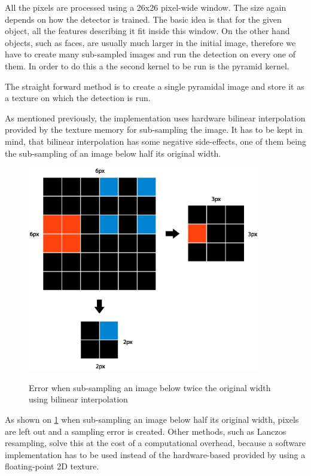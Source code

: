 All the pixels are processed using a 26x26 pixel-wide window. The size again depends on how the detector is trained. The basic idea is that for the given object, all the features describing it fit inside this window. On the other hand objects, such as faces, are usually much larger in the initial image, therefore we have to create many sub-sampled images and run the detection on every one of them. In order to do this a the second kernel to be run is the pyramid kernel.

The straight forward method is to create a single pyramidal image and store it as a texture on which the detection is run.

As mentioned previously, the implementation uses hardware bilinear interpolation provided by the texture memory for sub-sampling the image. It has to be kept in mind, that bilinear interpolation has some negative side-effects, one of them being the sub-sampling of an image below half its original width.

\begin{center}
\begin{figure}[h]
	\centering\includegraphics[height=9cm]{fig/bilinear_error.eps}\label{fig:bilinear-error}
	\caption{Error when sub-sampling an image below twice the original width using bilinear interpolation}
\end{figure}
\end{center}

As shown on \ref{fig:bilinear-error} when sub-sampling an image below half its original width, pixels are left out and a sampling error is created. Other methods, such as Lanczos resampling, solve this at the cost of a computational overhead, because a software implementation has to be used instead of the hardware-based provided by using a floating-point 2D texture.

